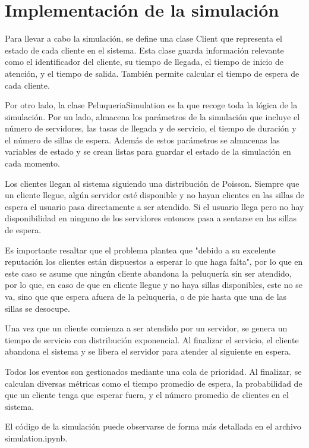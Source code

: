 \documentclass{article}
\begin{document}
\section{Implementación de la simulación}
Para llevar a cabo la simulación, se define una clase Client que representa el estado de cada cliente en el sistema. Esta clase guarda información relevante como el identificador del cliente, su tiempo de llegada, el tiempo de inicio de atención, y el tiempo de salida. También permite calcular el tiempo de espera de cada cliente.

Por otro lado, la clase PeluqueriaSimulation es la que recoge toda la lógica de la simulación. Por un lado, almacena los parámetros de la simulación que incluye el número de servidores, las tasas de llegada y de servicio, el tiempo de duración y el número de sillas de espera. Además de estos parámetros se almacenas las variables de estado y se crean listas para guardar el estado de la simulación en cada momento.

Los clientes llegan al sistema siguiendo una distribución de Poisson. Siempre que un cliente llegue, algún servidor esté disponible y no hayan clientes en las sillas de espera el usuario pasa directamente a ser atendido. Si el usuario llega pero no hay disponibilidad en ninguno de los servidores entonces pasa a sentarse en las sillas de espera.

Es importante resaltar que el problema plantea que "debido a su excelente reputación los clientes están dispuestos a esperar lo que haga falta", por lo que en este caso se asume que ningún cliente abandona la peluquería sin ser atendido, por lo que, en caso de que en cliente llegue y no haya sillas disponibles, este no se va, sino que que espera afuera de la peluqueria, o de pie hasta que una de las sillas se desocupe.

Una vez que un cliente comienza a ser atendido por un servidor, se genera un tiempo de servicio con distribución exponencial. Al finalizar el servicio, el cliente abandona el sistema y se libera el servidor para atender al siguiente en espera.

Todos los eventos son gestionados mediante una cola de prioridad. Al finalizar, se calculan diversas métricas como el tiempo promedio de espera, la probabilidad de que un cliente tenga que esperar fuera, y el número promedio de clientes en el sistema.

El código de la simulación puede observarse de forma más detallada en el archivo simulation.ipynb.
\end{document}
